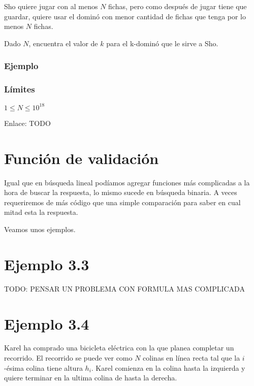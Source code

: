 Sho quiere jugar con al menos \(N\) fichas, pero como después de jugar tiene que guardar, quiere usar el dominó con menor cantidad de fichas que tenga por lo menos \(N\) fichas. 

Dado \(N\), encuentra el valor de \(k\) para el k-dominó que le sirve a Sho.

\subsubsection*{Ejemplo}
\begin{casebox2}
\end{casebox2}

\subsubsection*{Límites}
\begin{plimits}
	\item \(1\leq N \leq 10^{18}\)
\end{plimits}

Enlace: TODO

\section*{Función de validación}
Igual que en búsqueda lineal podíamos agregar funciones más complicadas a la hora de buscar la respuesta, lo mismo sucede en búsqueda binaria. A veces requeriremos de más código que una simple comparación para saber en cual mitad esta la respuesta.

Veamos unos ejemplos.


\section*{Ejemplo 3.3}
TODO: PENSAR UN PROBLEMA CON FORMULA MAS COMPLICADA

\section*{Ejemplo 3.4}
Karel ha comprado una bicicleta eléctrica con la que planea completar un recorrido. El recorrido se puede ver como \(N\) colinas en línea recta tal que la \(i\)-ésima colina tiene altura \(h_i\). Karel comienza en la colina hasta la izquierda y quiere terminar en la ultima colina de hasta la derecha.


